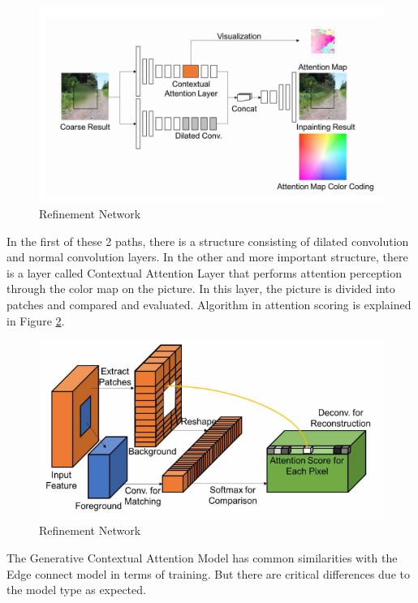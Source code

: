 \begin{figure}[h!]
    \centering
    \includegraphics[scale=0.95]{figures/chapter4/GenerativeAttention.PNG}
    \caption{Refinement Network \cite{generative_contextual}}
    \label{fig:refinement-network}
\end{figure}

In the first of these 2 paths, there is a structure consisting of dilated convolution and normal convolution layers. In the other and more important structure, there is a layer called Contextual Attention Layer that performs attention perception through the color map on the picture. In this layer, the picture is divided into patches and compared and evaluated. Algorithm in attention scoring is explained in Figure \ref{fig:attention-scoring}.

\begin{figure}[h!]
    \centering
    \includegraphics[scale=0.85]{figures/chapter4/GenerativeScoring.PNG}
    \caption{Refinement Network \cite{generative_contextual}}
    \label{fig:attention-scoring}
\end{figure}

The Generative Contextual Attention Model has common similarities with the Edge connect model in terms of training. But there are critical differences due to the model type as expected. 

